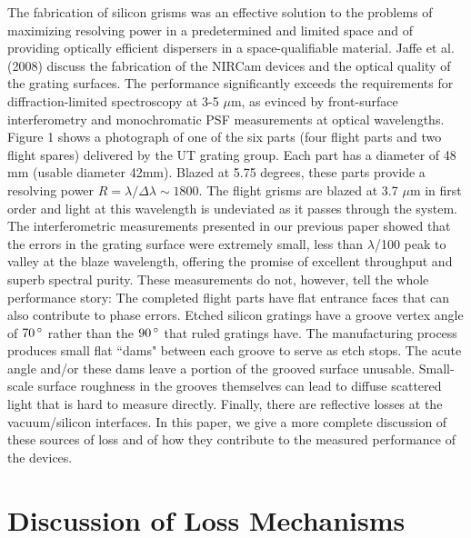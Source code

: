 The fabrication of silicon grisms was an effective solution to the problems of maximizing resolving power in a predetermined and limited space and of providing optically efficient dispersers in a space-qualifiable material.  Jaffe et al. (2008)\cite{Jaffe08} discuss the fabrication of the NIRCam devices and the optical quality of the grating surfaces.  The performance significantly exceeds the requirements for diffraction-limited spectroscopy at 3-5 $\mu$m, as evinced by front-surface interferometry and monochromatic PSF measurements at optical wavelengths.  Figure 1 shows a photograph of one of the six parts (four flight parts and two flight spares) delivered by the UT grating group.  Each part has a diameter of 48 mm (usable diameter 42mm).  Blazed at 5.75 degrees, these parts provide a resolving power $R=\lambda/\Delta \lambda \sim 1800$.  The flight grisms are blazed at 3.7 $\mu$m in first order and light at this wavelength is undeviated as it passes through the system.  The interferometric measurements presented in our previous paper showed that the errors in the grating surface were extremely small, less than $\lambda$/100 peak to valley at the blaze wavelength, offering the promise of excellent throughput and superb spectral purity.  These measurements do not, however, tell the whole performance story:  The completed flight parts have flat entrance faces that can also contribute to phase errors.  Etched silicon gratings have a groove vertex angle of $70\,^{\circ}{\rm}$ rather than the $90\,^{\circ}{\rm}$ that ruled gratings have.  The manufacturing process produces small flat ``dams" between each groove to serve as etch stops.  The acute angle and/or these dams leave a portion of the grooved surface unusable. Small-scale surface roughness in the grooves themselves can lead to diffuse scattered light that is hard to measure directly. Finally, there are reflective losses at the vacuum/silicon interfaces.   In this paper, we give a more complete discussion of these sources of loss and of how they contribute to the measured performance of the devices.

\section{Discussion of Loss Mechanisms}

